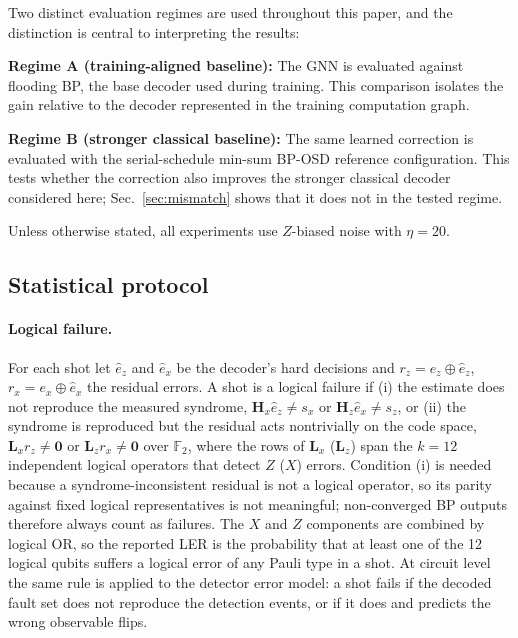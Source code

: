 \documentclass[a4paper,twocolumn,11pt,nopdfoutputerror]{quantumarticle}
\newcommand{\F}{\mathbb{F}}
\newcommand{\Hmat}{\mathbf{H}}
\begin{document}
Two distinct evaluation regimes are used throughout this paper,
and the distinction is central to interpreting the results:

\textbf{Regime A (training-aligned baseline):} The GNN is evaluated
against flooding BP, the base decoder used during training. This
comparison isolates the gain relative to the decoder represented in the
training computation graph.

\textbf{Regime B (stronger classical baseline):} The same learned
correction is evaluated with the serial-schedule min-sum BP-OSD reference
configuration. This tests whether the correction also improves the
stronger classical decoder considered here; Sec.~\ref{sec:mismatch}
shows that it does not in the tested regime.

Unless otherwise stated, all experiments use $Z$-biased noise with
$\eta = 20$.

\subsection{Statistical protocol}\label{sec:metrics}

\paragraph{Logical failure.} For each shot let $\hat{e}_z$ and
$\hat{e}_x$ be the decoder's hard decisions and $r_z=e_z\oplus\hat{e}_z$,
$r_x=e_x\oplus\hat{e}_x$ the residual errors. A shot is a logical failure
if (i) the estimate does not reproduce the measured syndrome,
$\Hmat_x\hat{e}_z\neq s_x$ or $\Hmat_z\hat{e}_x\neq s_z$, or (ii) the
syndrome is reproduced but the residual acts nontrivially on the code
space, $\mathbf{L}_x r_z\neq\mathbf{0}$ or $\mathbf{L}_z r_x\neq\mathbf{0}$
over $\F_2$, where the rows of $\mathbf{L}_x$ ($\mathbf{L}_z$) span the
$k=12$ independent logical operators that detect $Z$ ($X$) errors.
Condition (i) is needed because a syndrome-inconsistent residual is not a
logical operator, so its parity against fixed logical representatives is
not meaningful; non-converged BP outputs therefore always count as
failures. The $X$ and $Z$ components are combined by logical OR, so the
reported LER is the probability that at least one of the 12 logical
qubits suffers a logical error of any Pauli type in a shot. At circuit
level the same rule is applied to the detector error model: a shot fails
if the decoded fault set does not reproduce the detection events, or if
it does and predicts the wrong observable flips.
\end{document}
